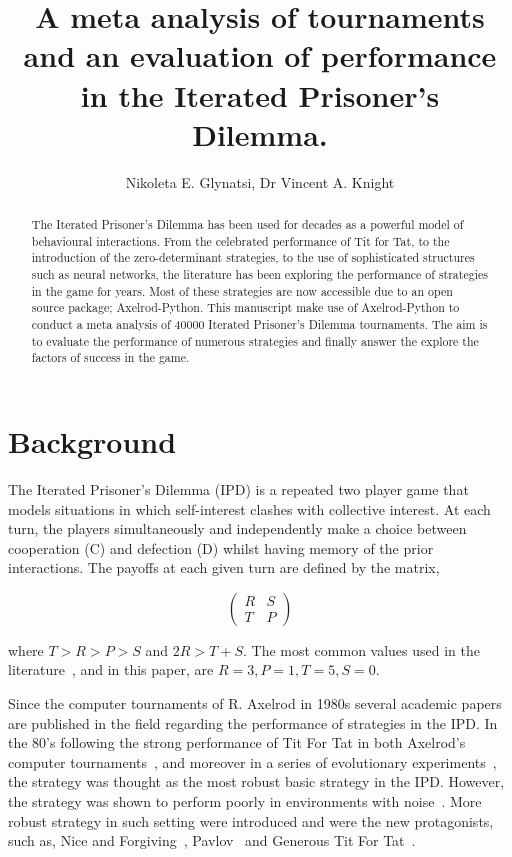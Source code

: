 \documentclass{article}
\title{A meta analysis of tournaments and an evaluation of performance in the
Iterated Prisoner's Dilemma.}
\author{Nikoleta E. Glynatsi, Dr Vincent A. Knight}
\date{}
\begin{document}
\maketitle

\begin{abstract}

The Iterated Prisoner's Dilemma has been used for decades as a powerful model of
behavioural interactions. From the celebrated performance of Tit for Tat, to the
introduction of the zero-determinant strategies, to the use of sophisticated
structures such as neural networks, the literature has been exploring the
performance of strategies in the game for years. Most of these strategies are
now accessible due to an open source package; Axelrod-Python. This manuscript
make use of Axelrod-Python to conduct a meta analysis of 40000 Iterated
Prisoner's Dilemma tournaments. The aim is to evaluate the performance of
numerous strategies and finally answer the explore the factors of success in the
game.
\end{abstract}

\section{Background}

The Iterated Prisoner's Dilemma (IPD) is a repeated two player game that models
situations in which self-interest clashes with collective interest. At each turn,
the players simultaneously and independently make a choice between cooperation (C) and
defection (D) whilst having memory of the prior interactions.
The payoffs at each given turn are defined by the matrix,

\[\begin{pmatrix}
R & S \\
T & P
\end{pmatrix}\]

where \(T > R > P > S\) and \(2R > T + S\). The most common values used in
the literature~\cite{Axelrod1981}, and in this paper, are $R=3, P=1, T=5, S=0$.

Since the computer tournaments of R. Axelrod in 1980s several academic papers
are published in the field regarding the performance of strategies in the IPD.
In the 80's following the strong performance of Tit For Tat in both Axelrod's
computer tournaments~\cite{Axelrod1980a, Axelrod1980b}, and moreover in a series
of evolutionary experiments~\cite{Axelrod1981}, the strategy was thought as the
most robust basic strategy in the IPD. However, the strategy was shown to
perform poorly in environments with noise~\cite{Bendor1991, Donninger1986,
Molander1985, Hammerstein1984}. More robust strategy in such setting were
introduced and were the new protagonists, such as, Nice and
Forgiving~\cite{Bendor1991}, Pavlov~\cite{Nowak1993} and Generous Tit For
Tat~\cite{Nowak1992}.
\end{document}
